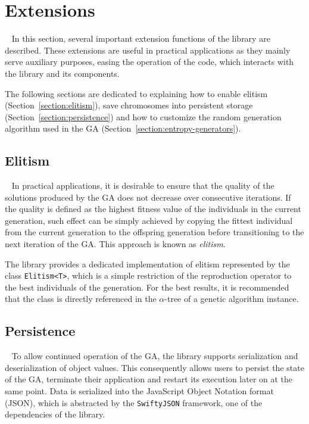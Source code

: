 \section{Extensions}~\label{section:extensions}
In this section, several important extension functions of the library are described. These extensions are useful in practical applications as they mainly serve auxiliary purposes, easing the operation of the code, which interacts with the library and its components.

The following sections are dedicated to explaining how to enable elitism (Section~\ref{section:elitism}), save chromosomes into persistent storage (Section~\ref{section:persistence}) and how to customize the random generation algorithm used in the GA (Section~\ref{section:entropy-generators}).

\subsection{Elitism}~\label{section:elitism}
In practical applications, it is desirable to ensure that the quality of the solutions produced by the GA does not decrease over consecutive iterations. If the quality is defined as the highest fitness value of the individuals in the current generation, such effect can be simply achieved by copying the fittest individual from the current generation to the offspring generation before transitioning to the next iteration of the GA. This approach is known as \textit{elitism}.

The library provides a dedicated implementation of elitism represented by the class \texttt{Elitism<T>}, which is a simple restriction of the reproduction operator to the best individuals of the generation. For the best results, it is recommended that the class is directly referenced in the $\alpha$-tree of a genetic algorithm instance.

\subsection{Persistence}~\label{section:persistence}
To allow continued operation of the GA, the library supports serialization and deserialization of object values. This consequently allows users to persist the state of the GA, terminate their application and restart its execution later on at the same point. Data is serialized into the JavaScript Object Notation format (JSON), which is abstracted by the \texttt{SwiftyJSON} framework, one of the dependencies of the library.

